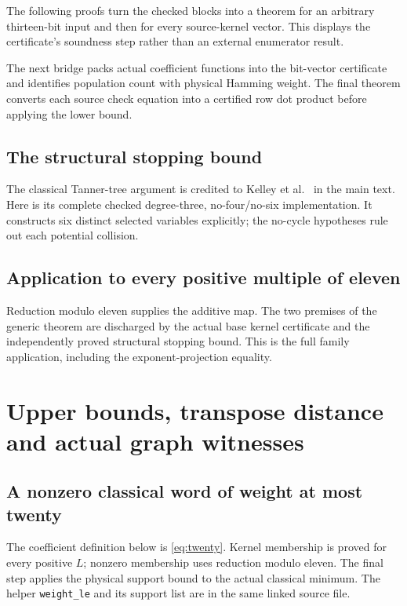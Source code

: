 The following proofs turn the checked blocks into a theorem for an arbitrary
thirteen-bit input and then for every source-kernel vector. This displays
the certificate's soundness step rather than an external enumerator result.

The next bridge packs actual coefficient functions into the bit-vector
certificate and identifies population count with physical Hamming weight.
The final theorem converts each source check equation into a certified row
dot product before applying the lower bound.

\subsection{The structural stopping bound}
The classical Tanner-tree argument is credited to Kelley et al.~\cite{Kelley}
in the main text. Here is its complete checked degree-three, no-four/no-six
implementation. It constructs six distinct selected variables explicitly;
the no-cycle hypotheses rule out each potential collision.

\subsection{Application to every positive multiple of eleven}
Reduction modulo eleven supplies the additive map. The two premises of
the generic theorem are discharged by the actual base kernel certificate
and the independently proved structural stopping bound. This is the full
family application, including the exponent-projection equality.

\clearpage
\section{Upper bounds, transpose distance and actual graph witnesses}\label{app:lean-geometry}

\subsection{A nonzero classical word of weight at most twenty}
The coefficient definition below is \eqref{eq:twenty}. Kernel membership
is proved for every positive $L$; nonzero membership uses reduction modulo
eleven. The final step applies the physical support bound to the actual
classical minimum. The helper \texttt{weight\_le} and its support list
are in the same linked source file.


